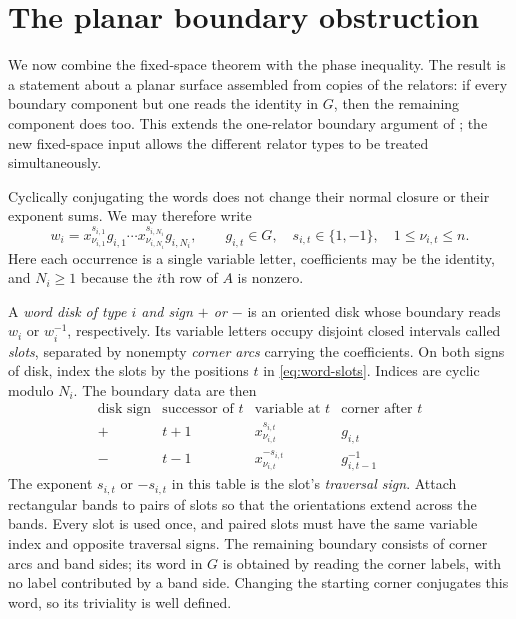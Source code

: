 \section{The planar boundary obstruction}\label{sec:planar}

We now combine the fixed-space theorem with the phase inequality.  The
result is a statement about a planar surface assembled from copies of the
relators: if every boundary component but one reads the identity in $G$,
then the remaining component does too.  This extends the one-relator
boundary argument of \cite[Theorem~4.1 and Section~4]{OpenAIKervaire2026};
the new fixed-space input allows the different relator types to be treated
simultaneously.

Cyclically conjugating the words does not change their normal closure or
their exponent sums.  We may therefore write
\begin{equation}\label{eq:word-slots}
 w_i=x_{\nu_{i,1}}^{s_{i,1}}g_{i,1}\cdots
     x_{\nu_{i,N_i}}^{s_{i,N_i}}g_{i,N_i},
 \qquad
 g_{i,t}\in G,\quad s_{i,t}\in\{1,-1\},\quad
 1\leq \nu_{i,t}\leq n.
\end{equation}
Here each occurrence is a single variable letter, coefficients may be the
identity, and $N_i\geq1$ because the $i$th row of $A$ is nonzero.

A \emph{word disk of type $i$ and sign $+$ or $-$} is an oriented disk
whose boundary reads $w_i$ or $w_i^{-1}$, respectively.  Its variable
letters occupy disjoint closed intervals called \emph{slots}, separated
by nonempty \emph{corner arcs} carrying the coefficients.  On both signs
of disk, index the slots by the positions $t$ in \eqref{eq:word-slots}.
Indices are cyclic modulo $N_i$.  The boundary data are then
\begin{equation}\label{eq:slot-conventions}
\begin{array}{c|c|c|c}
 \text{disk sign}&\text{successor of }t&
 \text{variable at }t&\text{corner after }t\\ \hline
 +&t+1&x_{\nu_{i,t}}^{s_{i,t}}&g_{i,t}\\
 -&t-1&x_{\nu_{i,t}}^{-s_{i,t}}&g_{i,t-1}^{-1}
\end{array}
\end{equation}
The exponent $s_{i,t}$ or $-s_{i,t}$ in this table is the slot's
\emph{traversal sign}.  Attach rectangular bands to pairs of slots so
that the orientations extend across the bands.  Every slot is used once,
and paired slots must have the same variable index and opposite traversal
signs.  The remaining boundary consists of corner arcs and band sides;
its word in $G$ is obtained by reading the corner labels, with no label
contributed by a band side.  Changing the starting corner conjugates this
word, so its triviality is well defined.

